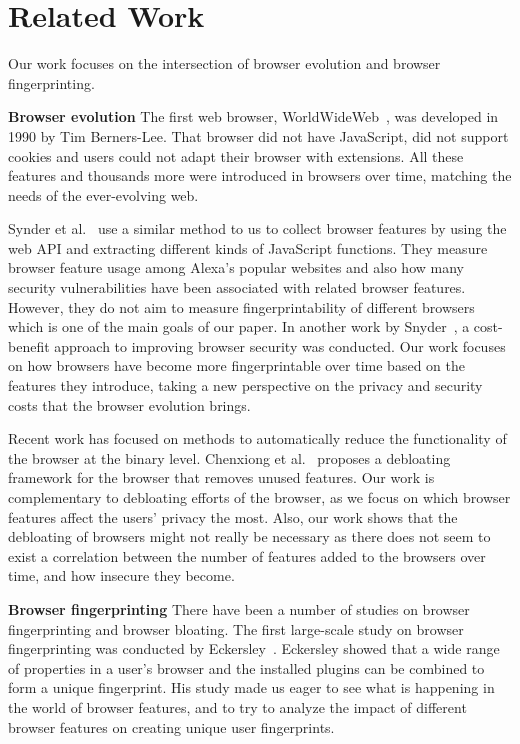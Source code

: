 \section{Related Work}
\label{sec:related-work}

Our work focuses on the intersection of browser evolution and browser
fingerprinting.

\textbf{Browser evolution} The first web browser,
WorldWideWeb~\cite{WorldWideWeb}, was developed in 1990 by Tim
Berners-Lee. That browser did not have JavaScript, did not support
cookies and users could not adapt their browser with extensions. All
these features and thousands more were introduced in browsers over
time, matching the needs of the ever-evolving web.

Synder et al.~\cite{snyder-imc16} use a similar method to us to
collect browser features by using the web API and extracting different
kinds of JavaScript functions. They measure browser feature usage
among Alexa's popular websites and also how many security
vulnerabilities have been associated with related browser
features. However, they do not aim to measure fingerprintability of
different browsers which is one of the main goals of our paper. In
another work by Snyder~\cite{snyder2017most}, a cost-benefit approach
to improving browser security was conducted.  Our work focuses on how
browsers have become more fingerprintable over time based on the
features they introduce, taking a new perspective on the privacy and
security costs that the browser evolution brings.

Recent work has focused on methods to automatically reduce the
functionality of the browser at the binary level. Chenxiong et
al.~\cite{slimium-ccs2020} proposes a debloating framework for the
browser that removes unused features. Our work is complementary to
debloating efforts of the browser, as we focus on which browser
features affect the users' privacy the most. Also, our work shows that
the debloating of browsers might not really be necessary as there does
not seem to exist a correlation between the number of features added
to the browsers over time, and how insecure they become.

\textbf{Browser fingerprinting} There have been a number of studies on
browser fingerprinting and browser bloating. The first large-scale
study on browser fingerprinting was conducted by
Eckersley~\cite{Eckersley}. Eckersley showed that a wide range of
properties in a user's browser and the installed plugins can be
combined to form a unique fingerprint. His study made us eager to see
what is happening in the world of browser features, and to try to
analyze the impact of different browser features on creating unique
user fingerprints.

